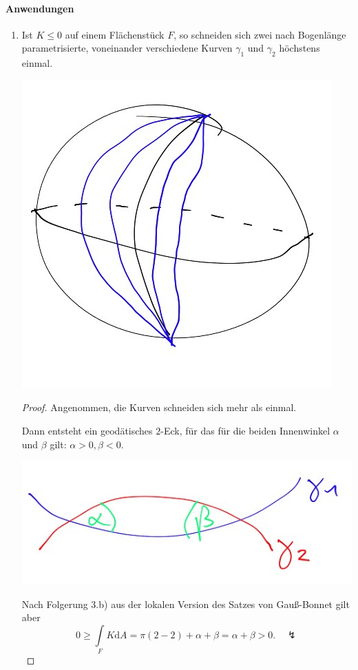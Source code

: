 \documentclass[a4paper,11pt,notitlepage]{report}
\theoremstyle{definition}
\begin{document}
\paragraph{Anwendungen}
\begin{enumerate}
	\item Ist $K \leq 0$ auf einem Flächenstück $F$, so schneiden sich zwei nach Bogenlänge parametrisierte, voneinander verschiedene Kurven $\gamma_1$ und $\gamma_2$ höchstens einmal.
	\begin{center}
	\includegraphics[scale=0.3]{images/2012_02_06_Bild2.jpg}
\end{center}
\begin{proof}
	Angenommen, die Kurven schneiden sich mehr als einmal.
	
	Dann entsteht ein geodätisches $2$-Eck, für das für die beiden Innenwinkel $\alpha$ und $\beta$ gilt: $\alpha > 0, \beta < 0$.
	\begin{center}
	\includegraphics[scale=0.3]{images/2012_02_06_Bild3.jpg}
\end{center}
	Nach Folgerung 3.b) aus der lokalen Version des Satzes von Gauß-Bonnet gilt aber
	$$0 \geq \int\limits_F{K \mathrm{d}A} = \pi (2-2) + \alpha + \beta = \alpha + \beta > 0. \quad \lightning$$ 
\end{proof}


\end{enumerate}
\end{document}
